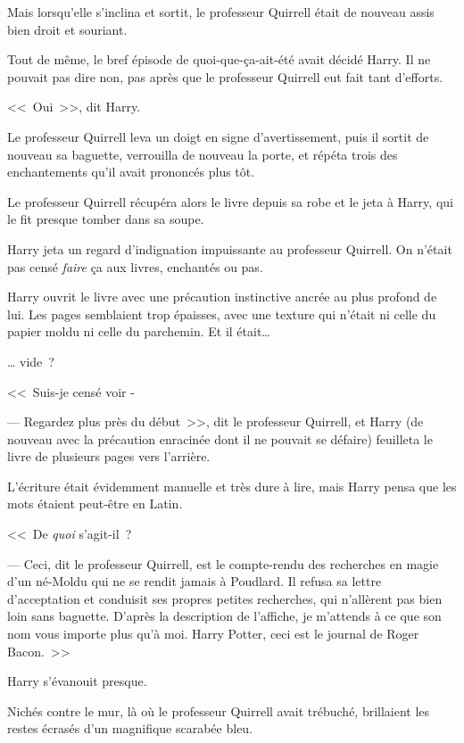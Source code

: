 Mais lorsqu'elle s'inclina et sortit, le professeur Quirrell était de nouveau assis bien droit et souriant.

Tout de même, le bref épisode de quoi-que-ça-ait-été avait décidé Harry. Il ne pouvait pas dire non, pas après que le professeur Quirrell eut fait tant d'efforts.

<<~Oui~>>, dit Harry.

Le professeur Quirrell leva un doigt en signe d'avertissement, puis il sortit de nouveau sa baguette, verrouilla de nouveau la porte, et répéta trois des enchantements qu'il avait prononcés plus tôt.

Le professeur Quirrell récupéra alors le livre depuis sa robe et le jeta à Harry, qui le fit presque tomber dans sa soupe.

Harry jeta un regard d'indignation impuissante au professeur Quirrell. On n'était pas censé \emph{faire} ça aux livres, enchantés ou pas.

Harry ouvrit le livre avec une précaution instinctive ancrée au plus profond de lui. Les pages semblaient trop épaisses, avec une texture qui n'était ni celle du papier moldu ni celle du parchemin. Et il était…

… vide~?

<<~Suis-je censé voir -

--- Regardez plus près du début~>>, dit le professeur Quirrell, et Harry (de nouveau avec la précaution enracinée dont il ne pouvait se défaire) feuilleta le livre de plusieurs pages vers l'arrière.

L'écriture était évidemment manuelle et très dure à lire, mais Harry pensa que les mots étaient peut-être en Latin.

<<~De \emph{quoi} s'agit-il~?

--- Ceci, dit le professeur Quirrell, est le compte-rendu des recherches en magie d'un né-Moldu qui ne se rendit jamais à Poudlard. Il refusa sa lettre d'acceptation et conduisit ses propres petites recherches, qui n'allèrent pas bien loin sans baguette. D'après la description de l'affiche, je m'attends à ce que son nom vous importe plus qu'à moi. Harry Potter, ceci est le journal de Roger Bacon.~>>

Harry s'évanouit presque.

Nichés contre le mur, là où le professeur Quirrell avait trébuché, brillaient les restes écrasés d'un magnifique scarabée bleu. 


